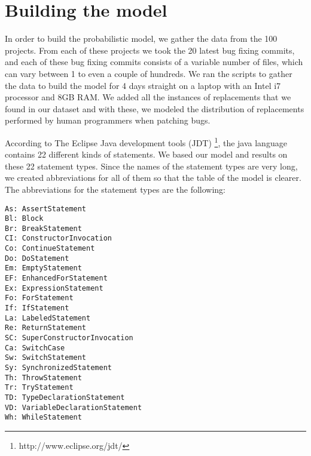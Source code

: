 
\section{Building the model}

In order to build the probabilistic model, we gather the data from the 100 projects. From each of these projects we took the 20 latest bug fixing commits, and each of these bug fixing commits consists of a variable number of files, which can vary between 1 to even a couple of hundreds.
We ran the scripts to gather the data to build the model for 4 days straight on a laptop with an Intel i7 processor and 8GB RAM. We added all the instances of replacements that we found in our dataset and with these, we modeled the distribution of replacements performed by human programmers when patching bugs.

According to The Eclipse Java development tools (JDT) \footnote{http://www.eclipse.org/jdt/}, the java language contains 22 different kinds of statements. We based our model and results on these 22 statement types. Since the names of the statement types are very long, we created abbreviations for all of them so that the table of the model is clearer. The abbreviations for the statement types are the following:

\begin{verbatim}
As: AssertStatement
Bl: Block
Br: BreakStatement
CI: ConstructorInvocation
Co: ContinueStatement
Do: DoStatement
Em: EmptyStatement
EF: EnhancedForStatement
Ex: ExpressionStatement
Fo: ForStatement
If: IfStatement
La: LabeledStatement
Re: ReturnStatement
SC: SuperConstructorInvocation
Ca: SwitchCase
Sw: SwitchStatement
Sy: SynchronizedStatement
Th: ThrowStatement
Tr: TryStatement
TD: TypeDeclarationStatement
VD: VariableDeclarationStatement
Wh: WhileStatement
\end{verbatim}



